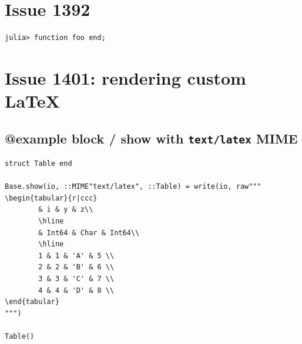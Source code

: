 \section{Issue 1392}



\label{987107409634109244}{}



\begin{verbatim}
julia> function foo end;
\end{verbatim}



\section{Issue 1401: rendering custom LaTeX}



\label{1766923436598802013}{}


\subsection{@example block / show with \texttt{text/latex} MIME}



\label{12212591717920375664}{}



\begin{verbatim}
struct Table end

Base.show(io, ::MIME"text/latex", ::Table) = write(io, raw"""
\begin{tabular}{r|ccc}
        & i & y & z\\
        \hline
        & Int64 & Char & Int64\\
        \hline
        1 & 1 & 'A' & 5 \\
        2 & 2 & 'B' & 6 \\
        3 & 3 & 'C' & 7 \\
        4 & 4 & 'D' & 8 \\
\end{tabular}
""")

Table()
\end{verbatim}

\begin{table}[h]
\centering
{}\end{table}


